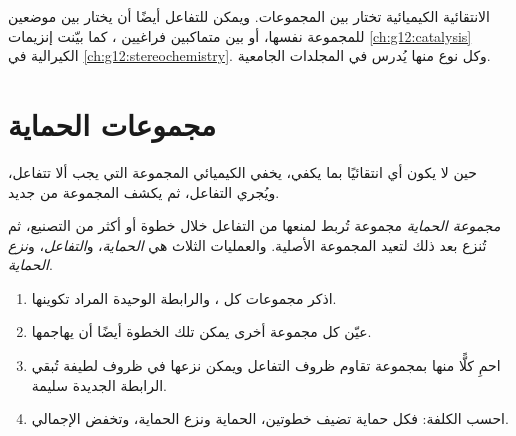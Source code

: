 \begin{remark}\label{rem:g12:synthesis-strategy:kinds}
الانتقائية الكيميائية تختار بين المجموعات. ويمكن للتفاعل أيضًا أن يختار
بين موضعين للمجموعة نفسها، أو بين متماكبين فراغيين
، كما بيّنت إنزيمات \cref{ch:g12:catalysis} 
الكيرالية في \cref{ch:g12:stereochemistry}. وكل نوع منها يُدرس
في المجلدات الجامعية.
\end{remark}

\section{مجموعات الحماية}

حين لا يكون أي  انتقائيًا بما يكفي، يخفي الكيميائي المجموعة التي
يجب ألا تتفاعل، ويُجري التفاعل، ثم يكشف المجموعة من جديد.

\begin{definition}\label{def:g12:synthesis-strategy:protecting-group}
\emph{مجموعة الحماية} مجموعة تُربط
 لمنعها من التفاعل خلال خطوة أو أكثر من
التصنيع، ثم تُنزع بعد ذلك لتعيد المجموعة الأصلية.
والعمليات الثلاث هي \emph{الحماية}، و\emph{التفاعل}،
و\emph{نزع الحماية}.
\end{definition}

\begin{method}\label{met:g12:synthesis-strategy:plan}
\begin{enumerate}
  \item اذكر مجموعات كل ، والرابطة الوحيدة المراد تكوينها.
  \item عيّن كل مجموعة أخرى يمكن  تلك الخطوة أيضًا أن
        يهاجمها.
  \item احمِ كلًّا منها بمجموعة تقاوم ظروف
        التفاعل ويمكن نزعها في ظروف لطيفة
        تُبقي الرابطة الجديدة سليمة.
  \item احسب الكلفة: فكل حماية تضيف خطوتين، الحماية ونزع
        الحماية، وتخفض  الإجمالي.
\end{enumerate}
\end{method}

